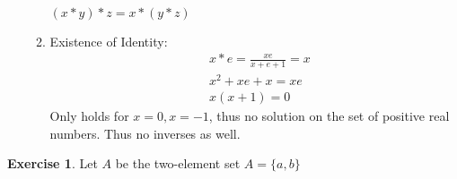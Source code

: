 \documentclass[nohyper,nobib]{tufte-handout}
\theoremstyle{definition}
\newtheorem{exer}[thm]{Exercise}
\theoremstyle{remark}
\begin{document}
\begin{enumerate}
\begin{enumerate}[i]
\begin{align}
                \end{align}
                $(x * y) * z = x * (y * z)$
            \item Existence of Identity:
                \begin{align}
                    &x * e = \frac{xe}{x + e + 1}  = x \nonumber \\
                    & x^2 + xe + x = xe \nonumber  \\
                    & x(x + 1) =0
                \end{align}
            Only holds for $x=0, x=-1$, thus no solution on the set of positive real numbers. Thus no inverses as well.
        \end{enumerate}
\end{enumerate}

\begin{exer}
    Let $A$ be the two-element set $A = \{a, b\}$ 
\end{exer}
\end{document}
